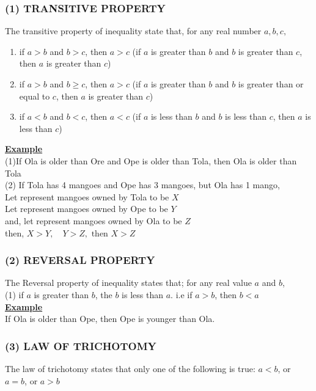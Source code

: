 \documentclass[12pt]{report}
\newcommand{\ubt}[1]{\textbf{\underline{#1}}}
\begin{document}
	\subsubsection{(1) TRANSITIVE PROPERTY}
	The transitive property of inequality state that, for any real number $a,b,c,$
	\begin{enumerate}
		\item if $a > b$ and $b>c$, then $a > c$ (if $a$ is greater than $b$ and $b$ is greater than $c$, then $a$ is greater than $c$)
		
		\item if $a>b$ and $b \geq c$, then $a>c$ (if $a$ is greater than $b$ and $b$ is greater than or equal to $c$, then $a$ is greater than $c$)
		
		\item if $a < b$ and $b<c$, then $a<c$ (if $a$ is less than $b$ and $b$ is less than $c$, then $a$ is less than $c$)
	\end{enumerate}
	\newpage
	\ubt{Example}\\
	(1)If Ola is older than Ore and Ope is older than Tola, then Ola is older than Tola\\
	(2) If Tola has 4 mangoes and Ope has 3 mangoes, but Ola has 1 mango,\\
	Let represent mangoes owned by Tola to be $X$\\
	Let represent mangoes owned by Ope to be $Y$\\
	and, let represent mangoes owned by Ola to be $Z$\\
	then, $X>Y, \quad Y>Z, \text{ then } X >Z$\\
	
	\subsubsection{(2) REVERSAL PROPERTY}
	The Reversal property of inequality states that; for any real value $a$ and $b$,\\
	(1) if $a$ is greater than $b$, the $b$ is less than $a$. i.e if $a>b$, then $b<a$\\
	\ubt{Example}\\
	If Ola is older than Ope, then Ope is younger than Ola.
	
	\subsubsection{(3) LAW OF TRICHOTOMY}
	The law of trichotomy states that only one of the following is true: $a<b$, or $a=b$, or $a>b$\\
	
\end{document}
